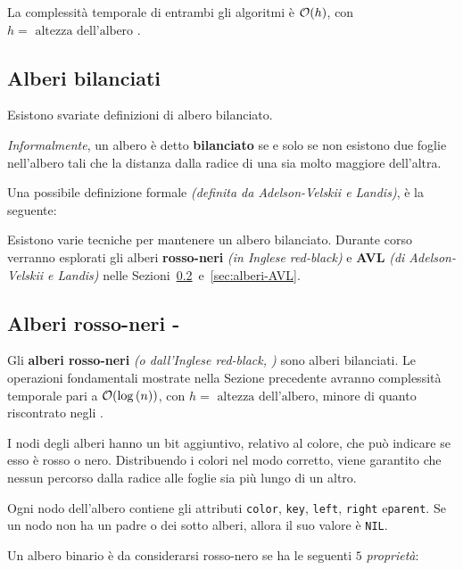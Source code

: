 \documentclass[italian, 10pt]{article}
\begin{document}
\bigskip
La complessità temporale di entrambi gli algoritmi è \(\mathcal{O}(h)\), con \(h = \text{ altezza dell'albero }\).

\subsection{Alberi bilanciati}

Esistono svariate definizioni di albero bilanciato.

\textit{Informalmente}, un albero è detto \textbf{bilanciato} se e solo se non esistono due foglie nell'albero tali che la distanza dalla radice di una sia molto maggiore dell'altra.

Una possibile definizione formale \textit{(definita da Adelson-Velskii e Landis)}, è la seguente:


Esistono varie tecniche per mantenere un albero bilanciato.
Durante corso verranno esplorati gli alberi \textbf{rosso-neri} \textit{(in Inglese red-black)} e \textbf{AVL} \textit{(di Adelson-Velskii e Landis)} nelle Sezioni~\ref{sec:alberi-rosso-neri}~e~\ref{sec:alberi-AVL}.

\subsection{Alberi rosso-neri - \RB}
\label{sec:alberi-rosso-neri}

Gli \textbf{alberi rosso-neri} \textit{(o dall'Inglese red-black, \RB)} sono alberi bilanciati.
Le operazioni fondamentali mostrate nella Sezione precedente avranno complessità temporale pari a \(\mathcal{O}(\log{(n)})\), con \(h = \text{ altezza dell'albero}\), minore di quanto riscontrato negli \BST.

I nodi degli alberi \RB hanno un bit aggiuntivo, relativo al colore, che può indicare se esso è rosso o nero.
Distribuendo i colori nel modo corretto, viene garantito che nessun percorso dalla radice alle foglie sia più lungo di un altro.

Ogni nodo dell'albero contiene gli attributi \texttt{color}, \texttt{key}, \texttt{left}, \texttt{right} e\texttt{parent}.
Se un nodo non ha un padre o dei sotto alberi, allora il suo valore è \texttt{NIL}.

Un albero binario è da considerarsi rosso-nero se ha le seguenti \(5\) \textit{proprietà}:
\end{document}
